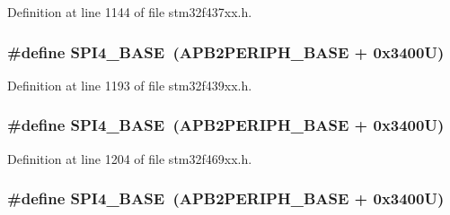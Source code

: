 Definition at line 1144 of file stm32f437xx.\+h.

\subsubsection[{\texorpdfstring{S\+P\+I4\+\_\+\+B\+A\+SE}{SPI4_BASE}}]{\setlength{\rightskip}{0pt plus 5cm}\#define S\+P\+I4\+\_\+\+B\+A\+SE~({\bf A\+P\+B2\+P\+E\+R\+I\+P\+H\+\_\+\+B\+A\+SE} + 0x3400\+U)}\hypertarget{group___peripheral__memory__map_gac5cfaedf263cee1e79554665f921c708}{}\label{group___peripheral__memory__map_gac5cfaedf263cee1e79554665f921c708}


Definition at line 1193 of file stm32f439xx.\+h.

\subsubsection[{\texorpdfstring{S\+P\+I4\+\_\+\+B\+A\+SE}{SPI4_BASE}}]{\setlength{\rightskip}{0pt plus 5cm}\#define S\+P\+I4\+\_\+\+B\+A\+SE~({\bf A\+P\+B2\+P\+E\+R\+I\+P\+H\+\_\+\+B\+A\+SE} + 0x3400\+U)}\hypertarget{group___peripheral__memory__map_gac5cfaedf263cee1e79554665f921c708}{}\label{group___peripheral__memory__map_gac5cfaedf263cee1e79554665f921c708}


Definition at line 1204 of file stm32f469xx.\+h.

\subsubsection[{\texorpdfstring{S\+P\+I4\+\_\+\+B\+A\+SE}{SPI4_BASE}}]{\setlength{\rightskip}{0pt plus 5cm}\#define S\+P\+I4\+\_\+\+B\+A\+SE~({\bf A\+P\+B2\+P\+E\+R\+I\+P\+H\+\_\+\+B\+A\+SE} + 0x3400\+U)}\hypertarget{group___peripheral__memory__map_gac5cfaedf263cee1e79554665f921c708}{}\label{group___peripheral__memory__map_gac5cfaedf263cee1e79554665f921c708}


